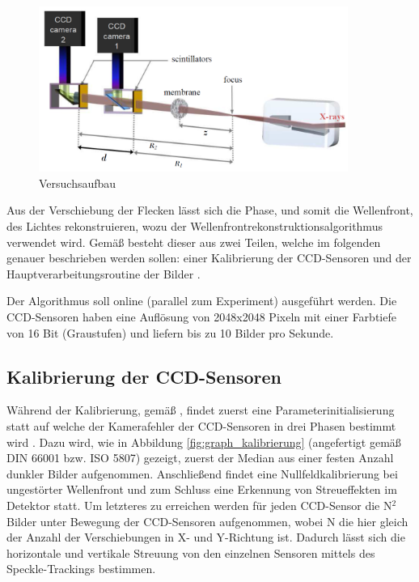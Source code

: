 \begin{figure}[htbp]
	\begin{center}
		\includegraphics[width=0.9\textwidth]{img/Versuchsaufbau}
		\caption[Versuchsaufbau]{Versuchsaufbau }
		\label{fig:versuch}
	\end{center}
\end{figure}

Aus der Verschiebung der Flecken lässt sich die Phase, und somit die Wellenfront, des Lichtes rekonstruieren, wozu der Wellenfrontrekonstruktionsalgorithmus verwendet wird. Gemäß \citeauthor{Ber13} besteht dieser aus zwei Teilen, welche im folgenden genauer beschrieben werden sollen: einer Kalibrierung der \gls{CCD}-Sensoren und der Hauptverarbeitungsroutine der Bilder . 

Der Algorithmus soll online (parallel zum Experiment) ausgeführt werden. Die \gls{CCD}-Sensoren haben eine Auflösung von 2048x2048 Pixeln mit einer Farbtiefe von 16 Bit (Graustufen) und liefern bis zu 10 Bilder pro Sekunde.

\subsection{Kalibrierung der CCD-Sensoren}

Während der Kalibrierung, gemäß \citeauthor{Ber13}, findet zuerst eine Parameterinitialisierung statt auf welche der Kamerafehler der \gls{CCD}-Sensoren in drei Phasen bestimmt wird . Dazu wird, wie in Abbildung \ref{fig:graph_kalibrierung} (angefertigt gemäß DIN 66001 bzw. ISO 5807) gezeigt, zuerst der Median aus einer festen Anzahl dunkler Bilder aufgenommen. Anschließend findet eine Nullfeldkalibrierung bei ungestörter Wellenfront und zum Schluss eine Erkennung von Streueffekten im Detektor statt. Um letzteres zu erreichen werden für jeden \gls{CCD}-Sensor die \gls{N}$^2$ Bilder unter Bewegung der \gls{CCD}-Sensoren aufgenommen, wobei \gls{N} die hier gleich der Anzahl der Verschiebungen in X- und Y-Richtung ist. Dadurch lässt sich die horizontale und vertikale Streuung von den einzelnen Sensoren mittels des Speckle-Trackings bestimmen. 

